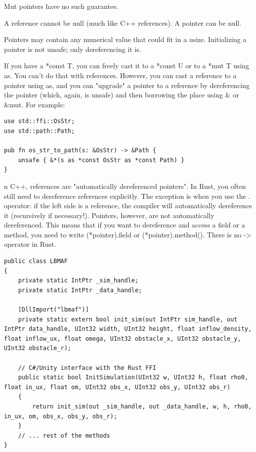 Mut pointers have no such guarantee.

A reference cannot be null (much like C++ references). A pointer can be null.

Pointers may contain any numerical value that could fit in a usize. Initializing a pointer is not unsafe; only dereferencing it is.

If you have a *const T, you can freely cast it to a *const U or to a *mut T using as. You can't do that with references. However, you can cast a reference to a pointer using as, and you can "upgrade" a pointer to a reference by dereferencing the pointer (which, again, is unsafe) and then borrowing the place using \& or \&mut. For example:

\begin{lstlisting}
use std::ffi::OsStr;
use std::path::Path;

pub fn os_str_to_path(s: &OsStr) -> &Path {
	unsafe { &*(s as *const OsStr as *const Path) }
}
\end{lstlisting}

n C++, references are "automatically dereferenced pointers". In Rust, you often still need to dereference references explicitly. The exception is when you use the . operator: if the left side is a reference, the compiler will automatically dereference it (recursively if necessary!). Pointers, however, are not automatically dereferenced. This means that if you want to dereference and access a field or a method, you need to write (*pointer).field or (*pointer).method(). There is no -> operator in Rust.


\begin{lstlisting}[language=Csharp, caption=., label=unity-rust-ffi-init-sim]
public class LBMAF
{
	private static IntPtr _sim_handle;
	private static IntPtr _data_handle;
	
	[DllImport("lbmaf")]
	private static extern bool init_sim(out IntPtr sim_handle, out IntPtr data_handle, UInt32 width, UInt32 height, float inflow_density, float inflow_ux, float omega, UInt32 obstacle_x, UInt32 obstacle_y, UInt32 obstacle_r);
	
	// C#/Unity interface with the Rust FFI
	public static bool InitSimulation(UInt32 w, UInt32 h, float rho0, float in_ux, float om, UInt32 obs_x, UInt32 obs_y, UInt32 obs_r)
	{
		return init_sim(out _sim_handle, out _data_handle, w, h, rho0, in_ux, om, obs_x, obs_y, obs_r);
	}
	// ... rest of the methods
}
\end{lstlisting}

